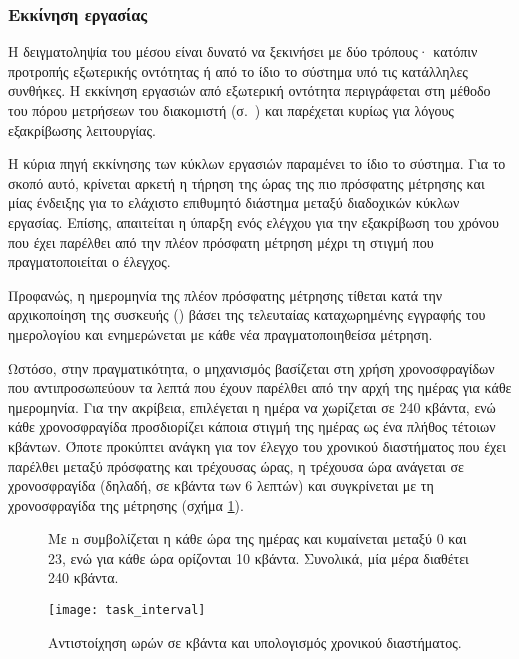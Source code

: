\subsubsection{Εκκίνηση εργασίας}
\label{ssubsec:task:initiate}

Η δειγματοληψία του μέσου είναι δυνατό να ξεκινήσει με δύο τρόπους· κατόπιν
προτροπής εξωτερικής οντότητας ή από το ίδιο το σύστημα υπό τις κατάλληλες
συνθήκες. Η εκκίνηση εργασιών από εξωτερική οντότητα περιγράφεται στη μέθοδο
 του πόρου μετρήσεων του διακομιστή
(σ.~\pageref{ssubsec:network:measurement-post}) και παρέχεται κυρίως για λόγους
εξακρίβωσης λειτουργίας.

Η κύρια πηγή εκκίνησης των κύκλων εργασιών παραμένει το ίδιο το σύστημα.
Για το σκοπό αυτό, κρίνεται
αρκετή η τήρηση της ώρας της πιο πρόσφατης μέτρησης και μίας ένδειξης για το
ελάχιστο επιθυμητό διάστημα μεταξύ διαδοχικών κύκλων εργασίας. Επίσης,
απαιτείται η ύπαρξη ενός ελέγχου για την εξακρίβωση του χρόνου που έχει παρέλθει
από την πλέον πρόσφατη μέτρηση μέχρι τη στιγμή που πραγματοποιείται ο έλεγχος.

Προφανώς, η ημερομηνία της πλέον πρόσφατης μέτρησης τίθεται κατά την
αρχικοποίηση της συσκευής () βάσει της τελευταίας καταχωρημένης
εγγραφής του ημερολογίου και ενημερώνεται με κάθε νέα πραγματοποιηθείσα μέτρηση.

Ωστόσο, στην πραγματικότητα, ο μηχανισμός βασίζεται στη χρήση χρονοσφραγίδων που
αντιπροσωπεύουν τα λεπτά που έχουν παρέλθει από την αρχή της ημέρας για κάθε
ημερομηνία. Για την ακρίβεια, επιλέγεται η ημέρα να χωρίζεται σε 240 κβάντα, ενώ
κάθε χρονοσφραγίδα προσδιορίζει κάποια στιγμή της ημέρας ως ένα πλήθος τέτοιων
κβάντων. Όποτε προκύπτει ανάγκη για τον έλεγχο του χρονικού διαστήματος που έχει
παρέλθει μεταξύ πρόσφατης και τρέχουσας ώρας, η τρέχουσα ώρα ανάγεται σε
χρονοσφραγίδα (δηλαδή, σε κβάντα των 6 λεπτών) και συγκρίνεται με τη
χρονοσφραγίδα της μέτρησης (σχήμα \ref{fig:task:interval}).

\begin{figure}
    \caption{Αντιστοίχηση ωρών σε κβάντα και υπολογισμός χρονικού διαστήματος.
    \label{fig:task:interval}}
    Με n συμβολίζεται η κάθε ώρα της ημέρας και κυμαίνεται μεταξύ 0 και 23, ενώ
    για κάθε ώρα ορίζονται 10 κβάντα. Συνολικά, μία μέρα διαθέτει 240 κβάντα.
    \begin{center}
    \texttt{[image: task\_interval]}
    \end{center}
\end{figure}

